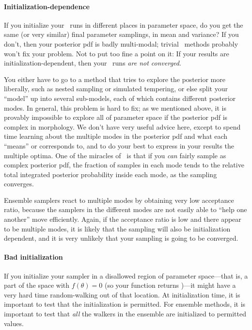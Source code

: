 \documentclass[modern]{aastex61}
\newcommand{\MCMC}{\acronym{MCMC}}
\newcommand{\pars}{\theta}
\begin{document}
\paragraph{Initialization-dependence}
If you initialize your \MCMC\ runs in different places in parameter space,
  do you get the same (or very similar) final parameter samplings,
  in mean and variance?
If you don't,
  then your posterior pdf is badly multi-modal;
  trivial \MCMC\ methods probably won't fix your problem.
Not to put too fine a point on it:
If your results are initialization-dependent,
  then your \MCMC\ runs \emph{are not converged}.

You either have to go to a method that tries to explore the posterior
  more liberally, such as nested sampling or simulated tempering,
  or else split your ``model'' up into several sub-models,
  each of which contains different posterior modes.
In general, this problem is hard to fix;
  as we mentioned above, it is provably impossible
  to explore all of parameter space if the posterior pdf is
  complex in morphology.
We don't have very useful advice here, except to
  spend time learning about the multiple modes in the posterior pdf
  and what each ``means'' or corresponds to,
  and to do your best to express in your results the multiple optima.
One of the miracles of \MCMC\ is that if you \emph{can} fairly sample
  as complex posterior pdf,
  the fraction of samples in each mode
  tends to the relative total integrated posterior probability inside each mode,
  as the sampling converges.

Ensemble samplers react to multiple modes
  by obtaining very low acceptance ratio,
  because the samplers in the different modes are not easily able to ``help one another''
  move efficiently.
Again, if the acceptance ratio is low and there appear to be multiple modes,
  it is likely that the sampling will also be initialization dependent,
  and it is very unlikely that your sampling is going to be converged.

\paragraph{Bad initialization}
If you initialize your sampler in a disallowed region of parameter
space---that is, a part of the space with $f(\pars)=0$ (so your
 function returns )---it might have a very
hard time random-walking out of that location.
At initialization time, it is important to test that the
initialization is permitted.
For ensemble methods, it is important to test that \emph{all} the
walkers in the ensemble are initialized to permitted values.
\end{document}
